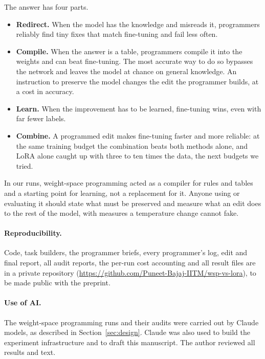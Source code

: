 The answer has four parts.
\begin{itemize}
  \item \textbf{Redirect.} When the model has the knowledge and misreads it, programmers reliably find tiny fixes that match fine-tuning and fail less often.
  \item \textbf{Compile.} When the answer is a table, programmers compile it into the weights and can beat fine-tuning. The most accurate way to do so bypasses the network and leaves the model at chance on general knowledge. An instruction to preserve the model changes the edit the programmer builds, at a cost in accuracy.
  \item \textbf{Learn.} When the improvement has to be learned, fine-tuning wins, even with far fewer labels.
  \item \textbf{Combine.} A programmed edit makes fine-tuning faster and more reliable: at the same training budget the combination beats both methods alone, and LoRA alone caught up with three to ten times the data, the next budgets we tried.
\end{itemize}

In our runs, weight-space programming acted as a compiler for rules and tables and a starting point for learning, not a replacement for it. Anyone using or evaluating it should state what must be preserved and measure what an edit does to the rest of the model, with measures a temperature change cannot fake.

\paragraph{Reproducibility.} Code, task builders, the programmer briefs, every programmer's log, edit and final report, all audit reports, the per-run cost accounting and all result files are in a private repository (\url{https://github.com/Puneet-Bajaj-IITM/wsp-vs-lora}), to be made public with the preprint.

\paragraph{Use of AI.} The weight-space programming runs and their audits were carried out by Claude models, as described in Section~\ref{sec:design}. Claude was also used to build the experiment infrastructure and to draft this manuscript. The author reviewed all results and text.
